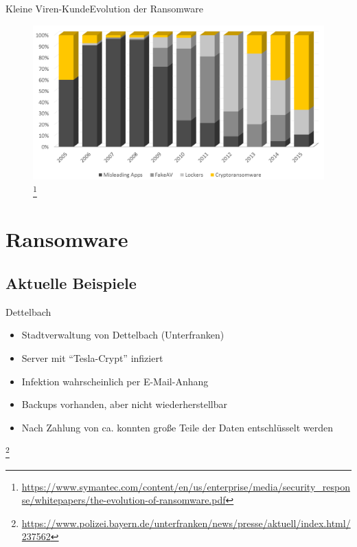 \documentclass[notes,10pt]{beamer}
\begin{document}
\begin{frame}{Kleine Viren-Kunde}{Evolution der Ransomware}
	\begin{figure}[p]
		\centering
		\includegraphics[scale=0.28]{ransom-evolution.png}
		\let\thefootnote\relax\footnote{\url{https://www.symantec.com/content/en/us/enterprise/media/security\_response/whitepapers/the-evolution-of-ransomware.pdf}}
	\end{figure}
\end{frame}


\section{Ransomware}
\subsection{Aktuelle Beispiele}
\begin{frame}{Dettelbach}

	\begin{itemize}
		\item Stadtverwaltung von Dettelbach (Unterfranken)
		\item Server mit "`Tesla-Crypt"' infiziert
		\item Infektion wahrscheinlich per E-Mail-Anhang
		\item Backups vorhanden\pause , aber nicht wiederherstellbar
		\item Nach Zahlung von ca.  konnten große Teile der Daten entschlüsselt werden
	\end{itemize}
	\let\thefootnote\relax\footnote{\url{https://www.polizei.bayern.de/unterfranken/news/presse/aktuell/index.html/237562}}
\end{frame}
\end{document}
